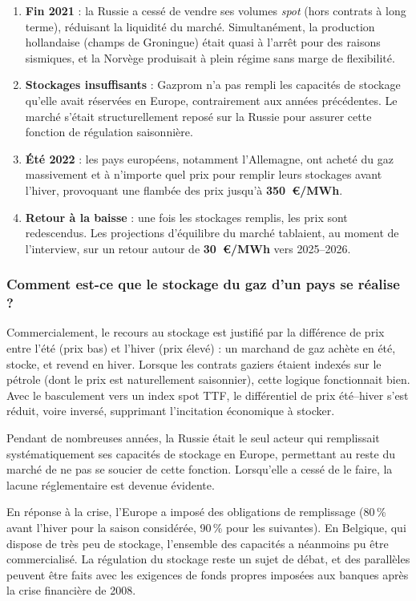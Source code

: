 \begin{enumerate}
    \item \textbf{Fin 2021} : la Russie a cessé de vendre ses volumes \textit{spot} (hors contrats à long terme), réduisant la liquidité du marché. Simultanément, la production hollandaise (champs de Groningue) était quasi à l'arrêt pour des raisons sismiques, et la Norvège produisait à plein régime sans marge de flexibilité.
    \item \textbf{Stockages insuffisants} : Gazprom n'a pas rempli les capacités de stockage qu'elle avait réservées en Europe, contrairement aux années précédentes. Le marché s'était structurellement reposé sur la Russie pour assurer cette fonction de régulation saisonnière.
    \item \textbf{Été 2022} : les pays européens, notamment l'Allemagne, ont acheté du gaz massivement et à n'importe quel prix pour remplir leurs stockages avant l'hiver, provoquant une flambée des prix jusqu'à \textbf{350~\euro/MWh}.
    \item \textbf{Retour à la baisse} : une fois les stockages remplis, les prix sont redescendus. Les projections d'équilibre du marché tablaient, au moment de l'interview, sur un retour autour de \textbf{30~\euro/MWh} vers 2025--2026.
\end{enumerate}

\subsubsection{Comment est-ce que le stockage du gaz d'un pays se réalise ?}

Commercialement, le recours au stockage est justifié par la différence de prix entre l'été (prix bas) et l'hiver (prix élevé) : un marchand de gaz achète en été, stocke, et revend en hiver. Lorsque les contrats gaziers étaient indexés sur le pétrole (dont le prix est naturellement saisonnier), cette logique fonctionnait bien. Avec le basculement vers un index spot TTF, le différentiel de prix été--hiver s'est réduit, voire inversé, supprimant l'incitation économique à stocker.

Pendant de nombreuses années, la Russie était le seul acteur qui remplissait systématiquement ses capacités de stockage en Europe, permettant au reste du marché de ne pas se soucier de cette fonction. Lorsqu'elle a cessé de le faire, la lacune réglementaire est devenue évidente.

En réponse à la crise, l'Europe a imposé des obligations de remplissage (80\,\% avant l'hiver pour la saison considérée, 90\,\% pour les suivantes). En Belgique, qui dispose de très peu de stockage, l'ensemble des capacités a néanmoins pu être commercialisé. La régulation du stockage reste un sujet de débat, et des parallèles peuvent être faits avec les exigences de fonds propres imposées aux banques après la crise financière de 2008.

